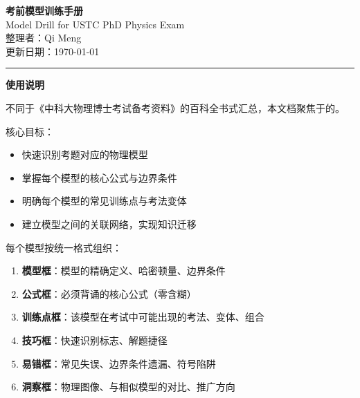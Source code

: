 



\begin{center}
{\Huge\bfseries\sffamily\color{ustcblue} 考前模型训练手册}\\[8pt]
{\Large Model Drill for USTC PhD Physics Exam}\\[12pt]
{\large 整理者：Qi Meng}\\[4pt]
{\normalsize 更新日期：\today}
\end{center}

\vspace{8pt}
\textcolor{ustcblue}{\rule{\linewidth}{2pt}}
\vspace{8pt}

\begin{center}
{\LARGE\bfseries\color{ustcblue} 使用说明}
\end{center}

\vspace{6pt}

\begin{insightbox}[本文档的定位]
不同于《中科大物理博士考试备考资料》的百科全书式汇总，本文档聚焦于的。

核心目标：
\begin{itemize}
    \item 快速识别考题对应的物理模型
    \item 掌握每个模型的核心公式与边界条件
    \item 明确每个模型的常见训练点与考法变体
    \item 建立模型之间的关联网络，实现知识迁移
\end{itemize}
\end{insightbox}

\vspace{4pt}

\begin{drillbox}[阅读指南]
每个模型按统一格式组织：
\begin{enumerate}[label=\textbf{\arabic*.}]
    \item \textcolor{modelteal}{\textbf{模型框}}：模型的精确定义、哈密顿量、边界条件
    \item \textcolor{successgreen}{\textbf{公式框}}：必须背诵的核心公式（零含糊）
    \item \textcolor{drillblue}{\textbf{训练点框}}：该模型在考试中可能出现的考法、变体、组合
    \item \textcolor{alertred}{\textbf{技巧框}}：快速识别标志、解题捷径
    \item \textcolor{errorred}{\textbf{易错框}}：常见失误、边界条件遗漏、符号陷阱
    \item \textcolor{royalpurple}{\textbf{洞察框}}：物理图像、与相似模型的对比、推广方向
\end{enumerate}
\end{drillbox}

